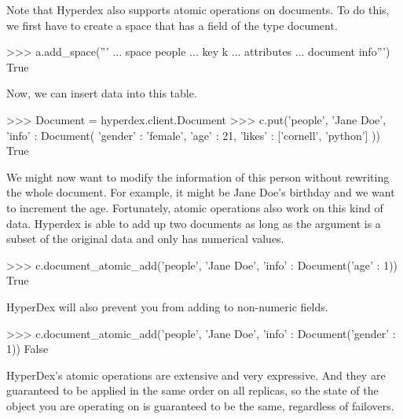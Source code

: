 Note that Hyperdex also supports atomic operations on documents. To do this, we first have to create a space that has a field of the type document.

\begin{pythoncode}
>>> a.add_space('''
... space people
... key k
... attributes
...    document info''')
True
\end{pythoncode}

Now, we can insert data into this table.

\begin{pythoncode}
>>> Document = hyperdex.client.Document
>>> c.put('people', 'Jane Doe', {'info' : Document( {'gender' : 'female', 'age' : 21, 'likes' : ['cornell', 'python']} )})
True
\end{pythoncode}

We might now want to modify the information of this person without rewriting the whole document. For example, it might be Jane Doe's birthday and we want to increment the age.
Fortunately, atomic operations also work on this kind of data. Hyperdex is able to add up two documents as long as the argument is a subset of the original data and only has numerical values.

\begin{pythoncode}
>>> c.document_atomic_add('people', 'Jane Doe', {'info' : Document({'age' : 1})})
True
\end{pythoncode}

HyperDex will also prevent you from adding to non-numeric fields.

\begin{pythoncode}
>>> c.document_atomic_add('people', 'Jane Doe', {'info' : Document({'gender' : 1})})
False
\end{pythoncode}

HyperDex's atomic operations are extensive and very expressive. And they are
guaranteed to be applied in the same order on all replicas, so the state of the
object you are operating on is guaranteed to be the same, regardless of
failovers.
